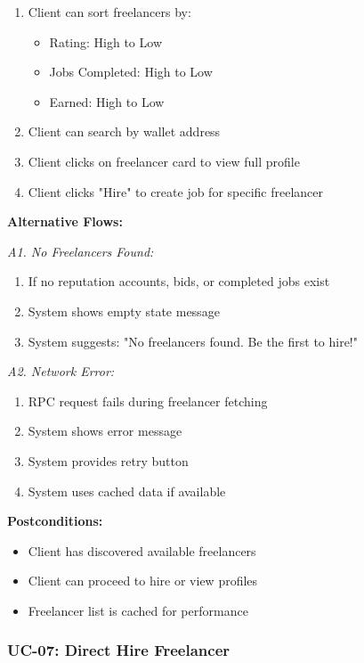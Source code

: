 \documentclass[a4paper,13pt,twoside]{report}
\theoremstyle{definition}
\begin{document}
\begin{enumerate}
\begin{itemize}
        \item Experience (All, Beginner, Intermediate, Experienced, Expert)
    \end{itemize}
    \item Client can sort freelancers by:
    \begin{itemize}
        \item Rating: High to Low
        \item Jobs Completed: High to Low
        \item Earned: High to Low
    \end{itemize}
    \item Client can search by wallet address
    \item Client clicks on freelancer card to view full profile
    \item Client clicks "Hire" to create job for specific freelancer
\end{enumerate}

\textbf{Alternative Flows:}

\textit{A1. No Freelancers Found:}
\begin{enumerate}
    \item If no reputation accounts, bids, or completed jobs exist
    \item System shows empty state message
    \item System suggests: "No freelancers found. Be the first to hire!"
\end{enumerate}

\textit{A2. Network Error:}
\begin{enumerate}
    \item RPC request fails during freelancer fetching
    \item System shows error message
    \item System provides retry button
    \item System uses cached data if available
\end{enumerate}

\textbf{Postconditions:}
\begin{itemize}
    \item Client has discovered available freelancers
    \item Client can proceed to hire or view profiles
    \item Freelancer list is cached for performance
\end{itemize}

\subsubsection{UC-07: Direct Hire Freelancer}
\end{document}
